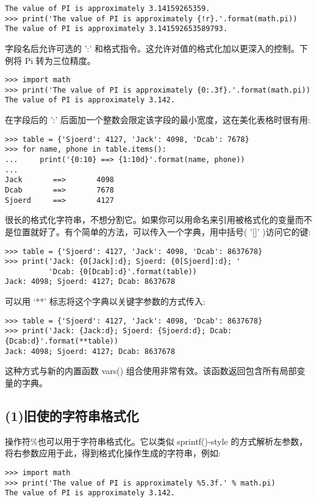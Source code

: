 \documentclass{article}
\begin{document}
\begin{CJK}{UTF8}{gbsn}
\begin{verbatim}
The value of PI is approximately 3.14159265359.
>>> print('The value of PI is approximately {!r}.'.format(math.pi))
The value of PI is approximately 3.141592653589793.
\end{verbatim}
字段名后允许可选的 ':' 和格式指令。这允许对值的格式化加以更深入的控制。下例将 Pi 转为三位精度。
\begin{verbatim}
>>> import math
>>> print('The value of PI is approximately {0:.3f}.'.format(math.pi))
The value of PI is approximately 3.142.
\end{verbatim}
在字段后的 ':' 后面加一个整数会限定该字段的最小宽度，这在美化表格时很有用:
\begin{verbatim}
>>> table = {'Sjoerd': 4127, 'Jack': 4098, 'Dcab': 7678}
>>> for name, phone in table.items():
...     print('{0:10} ==> {1:10d}'.format(name, phone))
...
Jack       ==>       4098
Dcab       ==>       7678
Sjoerd     ==>       4127
\end{verbatim}
很长的格式化字符串，不想分割它。如果你可以用命名来引用被格式化的变量而不是位置就好了。有个简单的方法，可以传入一个字典，用中括号( '[]' )访问它的键:
\begin{verbatim}
>>> table = {'Sjoerd': 4127, 'Jack': 4098, 'Dcab': 8637678}
>>> print('Jack: {0[Jack]:d}; Sjoerd: {0[Sjoerd]:d}; '
          'Dcab: {0[Dcab]:d}'.format(table))
Jack: 4098; Sjoerd: 4127; Dcab: 8637678
\end{verbatim}
可以用 ‘**’ 标志将这个字典以关键字参数的方式传入:
\begin{verbatim}
>>> table = {'Sjoerd': 4127, 'Jack': 4098, 'Dcab': 8637678}
>>> print('Jack: {Jack:d}; Sjoerd: {Sjoerd:d}; Dcab: {Dcab:d}'.format(**table))
Jack: 4098; Sjoerd: 4127; Dcab: 8637678
\end{verbatim}
这种方式与新的内置函数 vars() 组合使用非常有效。该函数返回包含所有局部变量的字典。
\subsection*{(1)旧使的字符串格式化}
操作符\%{}也可以用于字符串格式化。它以类似 sprintf()-style 的方式解析左参数，将右参数应用于此，得到格式化操作生成的字符串，例如:
\begin{verbatim}
>>> import math
>>> print('The value of PI is approximately %5.3f.' % math.pi)
The value of PI is approximately 3.142.
\end{verbatim}

\end{CJK}
\end{document}

